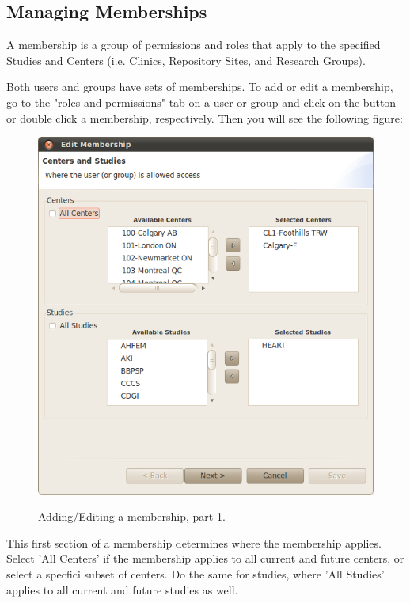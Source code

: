 \newpage
\subsection{Managing Memberships}
A membership is a group of permissions and roles that apply to the specified Studies
and Centers (i.e. Clinics, Repository Sites, and Research Groups).

Both users and groups have sets of memberships. To add or edit a membership, go to the
"roles and permissions" tab on a user or group and click on the \fbox{+} button or double
click a membership, respectively. Then you will see the following figure:

\begin{figure}[H]
  \centering
  \scalebox{0.5}
	   { \includegraphics*{screenshots/administration/edit_membership} }
	   \caption{Adding/Editing a membership, part 1.}
	   \label{fig:add_group}
\end{figure}

This first section of a membership determines where the membership applies. Select
'All Centers' if the membership applies to all current and future centers, or select
a specfici subset of centers. Do the same for studies, where 'All Studies' applies to all
current and future studies as well.

